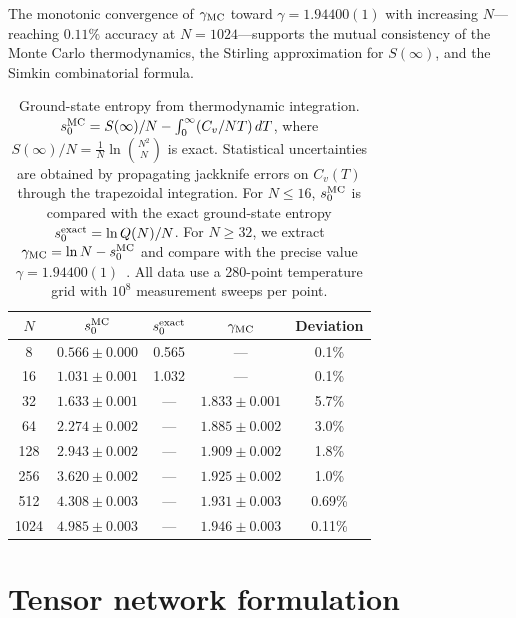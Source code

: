 \documentclass[aps, pre, reprint, amsmath, amssymb, superscriptaddress, floatfix]{revtex4-2}
\begin{document}
The monotonic convergence of $\gamma_{\rm MC}$ toward $\gamma = 1.94400(1)$ with
increasing $N$---reaching $0.11\%$ accuracy at $N = 1024$---supports
the mutual consistency of the Monte Carlo
thermodynamics, the Stirling approximation for $S(\infty)$, and the
Simkin combinatorial formula.

\begin{table}[t]
  \caption{Ground-state entropy from thermodynamic integration.
  $s_0^{\rm MC} = S(\infty)/N - \int_0^\infty (C_v/NT)\,dT$, where
  $S(\infty)/N = \frac{1}{N}\ln\binom{N^2}{N}$ is exact.
  Statistical uncertainties are obtained by propagating jackknife
  errors on $C_v(T)$ through the trapezoidal integration.
  For $N \le 16$, $s_0^{\rm MC}$ is compared with the exact
  ground-state entropy $s_0^{\rm exact} = \ln Q(N)/N$.
  For $N \ge 32$, we extract
  $\gamma_{\rm MC} = \ln N - s_0^{\rm MC}$ and compare with the
  precise value $\gamma = 1.94400(1)$~\cite{Nobel2023}.
  All data use a 280-point temperature grid with $10^8$
  measurement sweeps per point.}
  \label{tab:entropy_check}
  \begin{ruledtabular}
  \begin{tabular}{ccccc}
    $N$ & $s_0^{\rm MC}$
    & $s_0^{\rm exact}$
    & $\gamma_{\rm MC}$
    & Deviation \\
    \midrule
    8   & $0.566 \pm 0.000$ & 0.565 & --- & 0.1\% \\
    16  & $1.031 \pm 0.001$ & 1.032 & --- & 0.1\% \\
    \midrule
    32  & $1.633 \pm 0.001$ & --- & $1.833 \pm 0.001$ & 5.7\% \\
    64  & $2.274 \pm 0.002$ & --- & $1.885 \pm 0.002$ & 3.0\% \\
    128 & $2.943 \pm 0.002$ & --- & $1.909 \pm 0.002$ & 1.8\% \\
    256 & $3.620 \pm 0.002$ & --- & $1.925 \pm 0.002$ & 1.0\% \\
    512 & $4.308 \pm 0.003$ & --- & $1.931 \pm 0.003$ & 0.69\% \\
    1024 & $4.985 \pm 0.003$ & --- & $1.946 \pm 0.003$ & 0.11\% \\
  \end{tabular}
  \end{ruledtabular}
\end{table}


\section{Tensor network formulation}
\label{sec:tensor}
\end{document}
